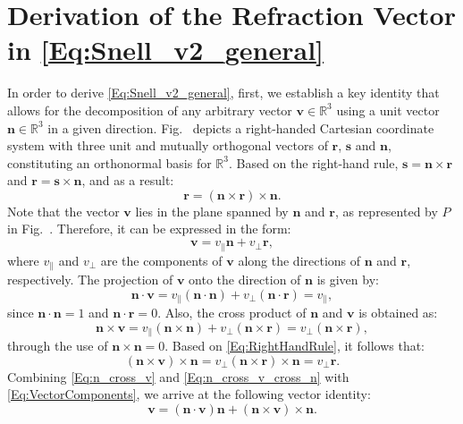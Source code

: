 \documentclass[lettersize,journal]{IEEEtran}
\begin{document}
\section{Derivation of the Refraction Vector in \eqref{Eq:Snell_v2_general}}\label{Appendix:A}
In order to derive \eqref{Eq:Snell_v2_general}, first, we establish a key identity that allows for the decomposition of any arbitrary vector $\mathbf{v}\in\mathbb{R}^3$ using a unit vector $\mathbf{n}\in\mathbb{R}^3$ in a given direction. Fig.~ depicts a right-handed Cartesian coordinate system with three unit and mutually orthogonal vectors of $\mathbf{r}$, $\mathbf{s}$ and $\mathbf{n}$, constituting an orthonormal basis for $\mathbb{R}^3$. Based on the right-hand rule, $\mathbf{s}=\mathbf{n}\times\mathbf{r}$ and $\mathbf{r}=\mathbf{s}\times\mathbf{n}$, and as a result:
%
\begin{equation}
    \mathbf{r} = \left(\mathbf{n}\times\mathbf{r}\right)\times\mathbf{n}.
    \label{Eq:RightHandRule}
\end{equation}
%
Note that the vector $\mathbf{v}$ lies in the plane spanned by $\mathbf{n}$ and $\mathbf{r}$, as represented by $P$ in Fig.~. Therefore, it can be expressed in the form:
%
\begin{equation}
    \mathbf{v} = v_\parallel\mathbf{n}+v_\perp\mathbf{r},
    \label{Eq:VectorComponents}
\end{equation}
%
where $v_\parallel$ and $v_\perp$ are the components of $\mathbf{v}$ along the directions of $\mathbf{n}$ and $\mathbf{r}$, respectively. The projection of $\mathbf{v}$ onto the direction of $\mathbf{n}$ is given by:
%
\begin{equation}
\mathbf{n}\cdot\mathbf{v} = v_\parallel\left(\mathbf{n}\cdot\mathbf{n}\right)+v_\perp\left(\mathbf{n}\cdot\mathbf{r}\right) = v_\parallel,
\label{Eq:n_dot_v}
\end{equation}
since $\mathbf{n}\cdot\mathbf{n}=1$ and $\mathbf{n}\cdot\mathbf{r}=0$. Also, the cross product of $\mathbf{n}$ and $\mathbf{v}$ is obtained as:
%
\begin{equation}
\mathbf{n}\times\mathbf{v} = v_\parallel\left(\mathbf{n}\times\mathbf{n}\right)+v_\perp\left(\mathbf{n}\times\mathbf{r}\right) = v_\perp\left(\mathbf{n}\times\mathbf{r}\right),
\label{Eq:n_cross_v}
\end{equation}
%
through the use of $\mathbf{n}\times\mathbf{n}=0$. Based on \eqref{Eq:RightHandRule}, it follows that:
%
\begin{equation}
\left(\mathbf{n}\times\mathbf{v}\right)\times\mathbf{n} = v_\perp\left(\mathbf{n}\times\mathbf{r}\right)\times\mathbf{n} = v_\perp\mathbf{r}.
\label{Eq:n_cross_v_cross_n}
\end{equation}
%
Combining \eqref{Eq:n_cross_v} and \eqref{Eq:n_cross_v_cross_n} with \eqref{Eq:VectorComponents}, we arrive at the following vector identity:
%
\begin{equation}
    \mathbf{v} = \left(\mathbf{n}\cdot\mathbf{v}\right)\mathbf{n}+\left(\mathbf{n}\times\mathbf{v}\right)\times\mathbf{n}.
    \label{Eq:VectorDecomposition}
\end{equation}
\end{document}
